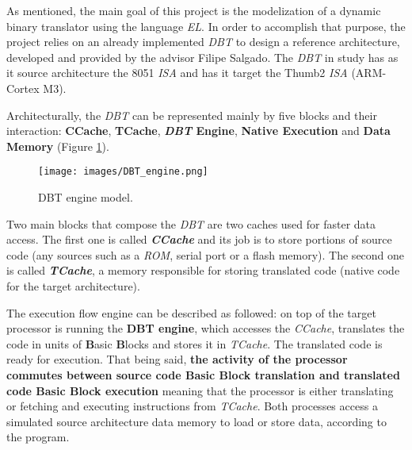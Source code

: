 
As mentioned, the main goal of this project is the modelization of a dynamic binary translator using the language \textit{EL}. In order to accomplish that purpose, the project relies on an already implemented \textit{DBT} to design a reference architecture, developed and provided by the advisor Filipe Salgado. The \textit{DBT} in study has as it source architecture the 8051 \textit{ISA} and has it target the Thumb2 \textit{ISA }(ARM-Cortex M3). 

Architecturally, the \textit{DBT}  can be represented mainly by five blocks and their interaction: \textbf{CCache}, \textbf{TCache}, \textbf{\textit{DBT} Engine}, \textbf{Native Execution} and \textbf{Data Memory} (Figure \ref{fig:DBT_Engine}).

\begin{figure}[!htb]
\centering
\texttt{[image: images/DBT\_engine.png]}
\caption{DBT engine model.}
\label{fig:DBT_Engine} 
\end{figure}

Two main blocks that compose the \textit{DBT} are two caches used for faster data access. The first one is called \textit{\textbf{CCache}} and its job is to store portions of source code (any sources such as a \textit{ROM}, serial port or a flash memory). The second one is called \textit{\textbf{TCache}}, a memory responsible for storing translated code (native code for the target architecture).

The execution flow engine can be described as followed: on top of the target processor is running the \textbf{DBT engine}, which accesses the \textit{CCache}, translates the code in units of \textbf{B}asic \textbf{B}locks and stores it in \textit{TCache}. The translated code is ready for execution. That being said, \textbf{the activity of the processor commutes between source code Basic Block translation and translated code Basic Block execution} meaning that the processor is either translating or fetching and executing instructions from \textit{TCache}. Both processes access a simulated source architecture data memory to load or store data, according to the program. \cite{DBT1}




